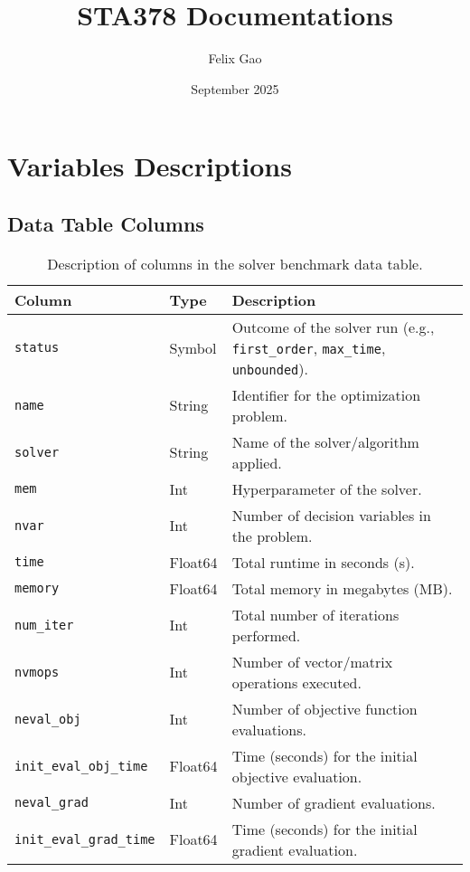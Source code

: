 \documentclass{article}
\title{STA378 Documentations}
\author{Felix Gao}
\date{September 2025}
\begin{document}
\maketitle

\section{Variables Descriptions}
\subsection*{Data Table Columns}

\begin{table}[h!]
\centering
\begin{tabular}{|l|l|p{9cm}|}
\hline
\textbf{Column} & \textbf{Type} & \textbf{Description} \\
\hline
\texttt{status} & Symbol   & Outcome of the solver run (e.g., \texttt{first\_order}, \texttt{max\_time}, \texttt{unbounded}). \\
\hline
\texttt{name} & String   & Identifier for the optimization problem. \\
\hline
\texttt{solver} & String   & Name of the solver/algorithm applied. \\
\hline
\texttt{mem} & Int   & Hyperparameter of the solver. \\
\hline
\texttt{nvar} & Int   & Number of decision variables in the problem. \\
\hline
\texttt{time} & Float64   & Total runtime in seconds (s). \\
\hline
\texttt{memory} & Float64   & Total memory in megabytes (MB). \\
\hline
\texttt{num\_iter} & Int   & Total number of iterations performed. \\
\hline
\texttt{nvmops} & Int   & Number of vector/matrix operations executed. \\
\hline
\texttt{neval\_obj} & Int   & Number of objective function evaluations. \\
\hline
\texttt{init\_eval\_obj\_time} & Float64   & Time (seconds) for the initial objective evaluation. \\
\hline
\texttt{neval\_grad} & Int   & Number of gradient evaluations. \\
\hline
\texttt{init\_eval\_grad\_time} & Float64   & Time (seconds) for the initial gradient evaluation. \\
\hline
\end{tabular}
\caption{Description of columns in the solver benchmark data table.}
\end{table}
\end{document}
